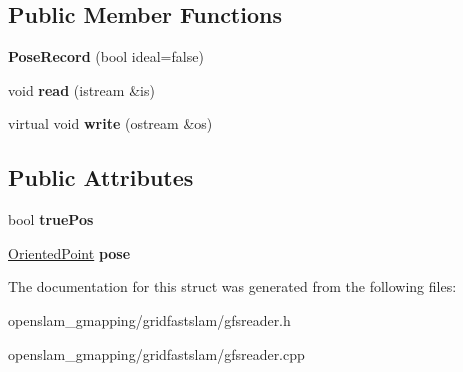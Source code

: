 \subsection*{Public Member Functions}
\begin{DoxyCompactItemize}
\item 
\mbox{\label{structGMapping_1_1GFSReader_1_1PoseRecord_af7fce1f55b2fdefd5124681e1a3c20a0}} 
{\bfseries Pose\+Record} (bool ideal=false)
\item 
\mbox{\label{structGMapping_1_1GFSReader_1_1PoseRecord_a3dd03a327aeede17e7da2ecb62fed521}} 
void {\bfseries read} (istream \&is)
\item 
\mbox{\label{structGMapping_1_1GFSReader_1_1PoseRecord_aeec468bc94157a0018047ea7823e1bfc}} 
virtual void {\bfseries write} (ostream \&os)
\end{DoxyCompactItemize}
\subsection*{Public Attributes}
\begin{DoxyCompactItemize}
\item 
\mbox{\label{structGMapping_1_1GFSReader_1_1PoseRecord_a5afa59f10415da8c0594c95476b70bf8}} 
bool {\bfseries true\+Pos}
\item 
\mbox{\label{structGMapping_1_1GFSReader_1_1PoseRecord_a590cc5e8ba57476d5753f05e98f44334}} 
\hyperlink{structGMapping_1_1orientedpoint}{Oriented\+Point} {\bfseries pose}
\end{DoxyCompactItemize}


The documentation for this struct was generated from the following files\+:\begin{DoxyCompactItemize}
\item 
openslam\+\_\+gmapping/gridfastslam/gfsreader.\+h\item 
openslam\+\_\+gmapping/gridfastslam/gfsreader.\+cpp\end{DoxyCompactItemize}
